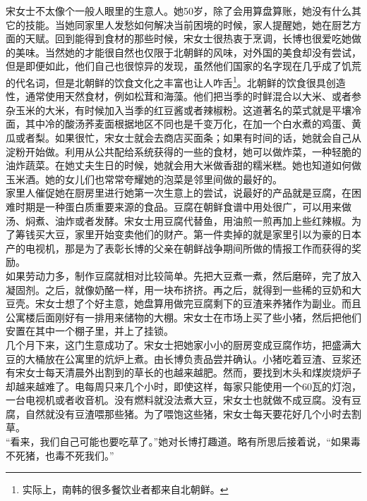 \begin{multicols}{\theparacolNo}
宋女士不太像个一般人眼里的生意人。她50岁，除了会用算盘算账，她没有什么其它的技能。当她同家里人发愁如何解决当前困境的时候，家人提醒她，她在厨艺方面的天赋。回到能得到食材的那些时候，宋女士很热衷于烹调，长博也很爱吃她做的美味。当然她的才能很自然也仅限于北朝鲜的风味，对外国的美食却没有尝试，但是即便如此，他们自己也很惊异的发现，虽然他们国家的名字现在几乎成了饥荒的代名词，但是北朝鲜的饮食文化之丰富也让人咋舌\footnote{实际上，南韩的很多餐饮业者都来自北朝鲜。}。北朝鲜的饮食很具创造性，通常使用天然食材，例如松茸和海藻。他们把当季的时鲜混合以大米、或者参杂玉米的大米，有时候加入当季的红豆酱或者辣椒粉。这道著名的菜式就是平壤冷面，其中冷的酸汤荞麦面根据地区不同也是千变万化，在加一个白水煮的鸡蛋、黄瓜或者梨。如果很忙，宋女士就会去商店买面条；如果有时间的话，她就会自己从淀粉开始做。利用从公共配给系统获得的一些的食材，她可以做炸菜，一种轻脆的油炸蔬菜。在她丈夫生日的时候，她就会用大米做香甜的糯米糕。她也知道如何做玉米酒。她的女儿们也常常夸耀她的泡菜是邻里间做的最好的。\\

家里人催促她在厨房里进行她第一次生意上的尝试，说最好的产品就是豆腐，在困难时期是一种蛋白质重要来源的食品。豆腐在朝鲜食谱中用处很广，可以用来做汤、焖煮、油炸或者发酵。宋女士用豆腐代替鱼，用油煎一煎再加上些红辣椒。为了筹钱买大豆，家里开始变卖他们的财产。第一件卖掉的就是家里引以为豪的日本产的电视机，那是为了表彰长博的父亲在朝鲜战争期间所做的情报工作而获得的奖励。\\

如果劳动力多，制作豆腐就相对比较简单。先把大豆煮一煮，然后磨碎，完了放入凝固剂。之后，就像奶酪一样，用一块布挤挤。再之后，就得到一些稀的豆奶和大豆壳。宋女士想了个好主意，她盘算用做完豆腐剩下的豆渣来养猪作为副业。而且公寓楼后面刚好有一排用来储物的大棚。宋女士在市场上买了些小猪，然后把他们安置在其中一个棚子里，并上了挂锁。\\

几个月下来，这门生意成功了。宋女士把她家小小的厨房变成豆腐作坊，把盛满大豆的大桶放在公寓里的炕炉上煮。由长博负责品尝并确认。小猪吃着豆渣、豆浆还有宋女士每天清晨外出割到的草长的也越来越肥。然而，要找到木头和煤炭烧炉子却越来越难了。电每周只来几个小时，即使这样，每家只能使用一个60瓦的灯泡，一台电视机或者收音机。没有燃料就没法煮大豆，宋女士也就做不成豆腐。没有豆腐，自然就没有豆渣喂那些猪。为了喂饱这些猪，宋女士每天要花好几个小时去割草。\\

“看来，我们自己可能也要吃草了。”她对长博打趣道。略有所思后接着说，“如果毒不死猪，也毒不死我们。”\\


\end{multicols}
